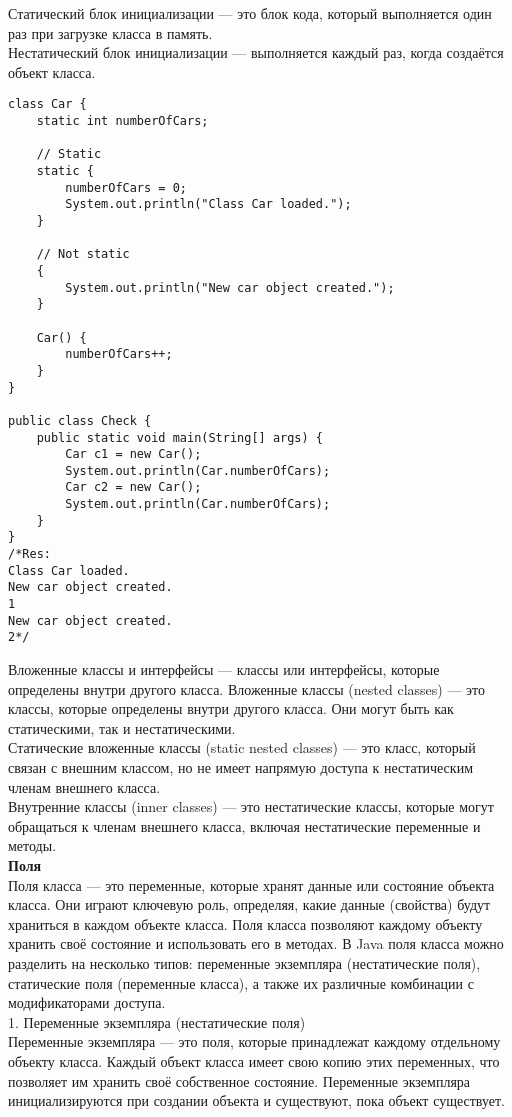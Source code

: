 Статический блок инициализации — это блок кода, который выполняется один раз при загрузке класса в память. \\
Нестатический блок инициализации — выполняется каждый раз, когда создаётся объект класса. \\
\begin{lstlisting}
class Car {
    static int numberOfCars;

    // Static
    static {
        numberOfCars = 0;
        System.out.println("Class Car loaded.");
    }

    // Not static
    {
        System.out.println("New car object created.");
    }

    Car() {
        numberOfCars++;
    }
}

public class Check {
    public static void main(String[] args) {
        Car c1 = new Car();
        System.out.println(Car.numberOfCars);
        Car c2 = new Car();
        System.out.println(Car.numberOfCars);
    }
}
/*Res: 
Class Car loaded.
New car object created.
1
New car object created.
2*/
\end{lstlisting}
Вложенные классы и интерфейсы — классы или интерфейсы, которые определены внутри другого класса. Вложенные классы (nested classes) — это классы, которые определены внутри другого класса. Они могут быть как статическими, так и нестатическими. \\
Статические вложенные классы (static nested classes) — это класс, который связан с внешним классом, но не имеет напрямую доступа к нестатическим членам внешнего класса. \\
Внутренние классы (inner classes) — это нестатические классы, которые могут обращаться к членам внешнего класса, включая нестатические переменные и методы. \\
\textbf{Поля} \\
Поля класса — это переменные, которые хранят данные или состояние объекта класса. Они играют ключевую роль, определяя, какие данные (свойства) будут храниться в каждом объекте класса. Поля класса позволяют каждому объекту хранить своё состояние и использовать его в методах. В Java поля класса можно разделить на несколько типов: переменные экземпляра (нестатические поля), статические поля (переменные класса), а также их различные комбинации с модификаторами доступа. \\
1. Переменные экземпляра (нестатические поля) \\
Переменные экземпляра — это поля, которые принадлежат каждому отдельному объекту класса. Каждый объект класса имеет свою копию этих переменных, что позволяет им хранить своё собственное состояние. Переменные экземпляра инициализируются при создании объекта и существуют, пока объект существует. \\
